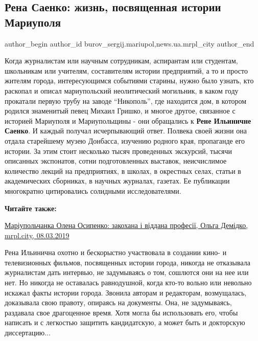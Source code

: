  
 
 
 
 
 
\subsection{Рена Саенко: жизнь, посвященная истории Мариуполя}
\label{sec:09_03_2019.stz.news.ua.mrpl_city.1.rena_sajenko}
 
\ifcmt
 author_begin
   author_id burov_sergij.mariupol,news.ua.mrpl_city
 author_end
\fi


Когда журналистам или научным сотрудникам, аспирантам или студентам, школьникам
или учителям, составителям истории предприятий, а то и просто жителям города,
интересующимся событиями старины, нужно было узнать, кто раскопал и описал
мариупольский неолитический могильник, в каком году прокатали первую трубу на
заводе \enquote{Никополь}, где находится дом, в котором родился знаменитый певец Михаил
Гришко, и многое другое, связанное с историей Мариуполя и Мариупольщины - они
обращались к \textbf{Рене Ильиничне Саенко}. И каждый получал исчерпывающий ответ.
Полвека своей жизни она отдала старейшему музею Донбасса, изучению родного
края, пропаганде его истории. За этим стоит несколько тысяч проведенных
экскурсий, тысячи описанных экспонатов, сотни подготовленных выставок,
неисчислимое количество лекций на предприятиях, в школах, в окрестных селах,
статьи в академических сборниках, в научных журналах, газетах. Ее публикации
многократно цитировались солидными исследователями.

\textbf{Читайте также:} 

\href{https://mrpl.city/blogs/view/mariupolchanka-olena-osipenko-zakohana-i-viddana-profesii}{%
Маріупольчанка Олена Осипенко: закохана і віддана професії, Ольга Демідко, mrpl.city, 08.03.2019}

Рена Ильинична охотно и бескорыстно участвовала в создании кино- и
телевизионных фильмов, посвященных истории города, никогда не отказывала
журналистам дать интервью, не задумываясь о том, сошлются они на нее или нет.
Но никогда не оставалась равнодушной, когда кто-то вольно или невольно искажал
факты истории города. Звонила авторам и редакторам, возмущалась, доказывала
свою правоту, опираясь на документы. Она, не задумываясь, раздавала свое
драгоценное время. Хотя могла бы использовать его, чтобы написать и с
легкостью защитить кандидатскую, а может быть и докторскую диссертацию...


